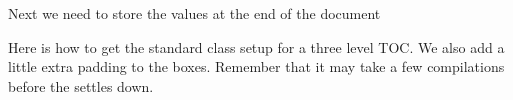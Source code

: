 \begin{sniplet}
  Next we need to store the values at the end of the document
  \begin{lcode}
  \end{lcode}

  Here is how to get the standard class setup for a three level
  TOC. We also add a little extra padding to the boxes. Remember that
  it may take a few compilations before the \toc{} settles down.
  \begin{lcode}
    \newlength\cftnumpad         %
    \setlength\cftnumpad{0.5em}
  \end{lcode}
\end{sniplet}



